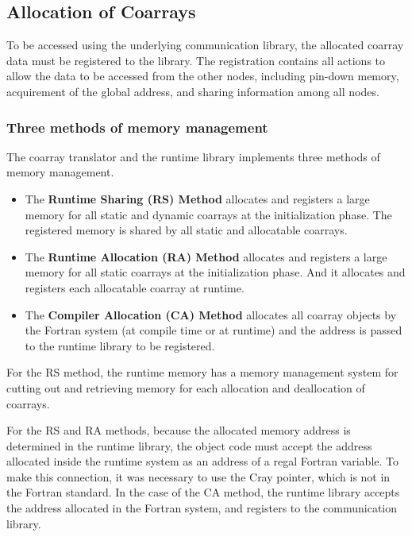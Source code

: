 \subsection{Allocation of Coarrays}

To be accessed using the underlying communication library,
the allocated coarray data must be registered to the library.
The registration contains all actions to allow the data to be accessed 
from the other nodes, including pin-down memory, acquirement of the global address,
and sharing information among all nodes.

\subsubsection{Three methods of memory management}

The coarray translator and the runtime library implements three methods of
memory management.
\begin{itemize}
\item
The {\bf Runtime Sharing (RS) Method} allocates and registers a large memory 
for all static and dynamic coarrays at the initialization phase.
The registered memory is shared by all static and allocatable coarrays. 

\item
The {\bf Runtime Allocation (RA) Method} allocates and registers a large memory
for all static coarrays at the initialization phase.
And it allocates and registers each allocatable coarray at runtime.

\item
The {\bf Compiler Allocation (CA) Method} allocates all coarray objects by 
the Fortran system (at compile time or at runtime) and the address is 
passed to the runtime library to be registered.
\end{itemize}

For the RS method, the runtime memory has a memory management system for
cutting out and retrieving memory for each allocation and deallocation of 
coarrays.

For the RS and RA methods, 
because the allocated memory address is determined in the runtime library, 
the object code must accept the address allocated 
inside the runtime system as an address of a regal Fortran variable.
To make this connection, it was necessary to use the Cray pointer, which is not 
in the Fortran standard.
In the case of the CA method, the runtime library accepts the address allocated
in the Fortran system, and registers to the communication library.


